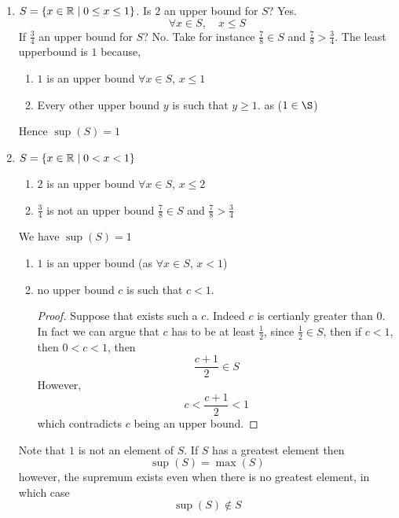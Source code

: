\documentclass{article}
\begin{document}
\begin{eg}\leavevmode
    \begin{enumerate}[label=(\arabic*)]
        \item $S = \left\{ x \in \mathbb{R} \mid 0 \leq x \leq 1 \right\}$.
        Is $2$ an upper bound for $S$? Yes.
        \[
            \forall x \in S, \quad x \leq S  
        \]
        If $\frac{3}{4}$ an upper bound for $S$? No. 
        Take for instance $\frac{7}{8} \in S$ and $\frac{7}{8} > \frac{3}{4}$.
        The least upperbound is $1$ because,
        \begin{enumerate}[label=(\roman*)]
            \item $1$ is an upper bound $\forall x \in S$, $x \leq 1$
            \item Every other upper bound $y$ is such that $y \geq 1$. as ($1 \in \S$)
        \end{enumerate}
        Hence $\sup(S) = 1$

        \item $S = \left\{ x \in \mathbb{R} \mid 0 < x < 1 \right\}$
        \begin{enumerate}[label=(\roman*)]
            \item $2$ is an upper bound $\forall x \in S$, $x \leq 2$
            \item $\frac{3}{4}$ is not an upper bound $\frac{7}{8} \in S$ and $\frac{7}{8} > \frac{3}{4}$
        \end{enumerate}
        We have $\sup(S) = 1$
        \begin{enumerate}[label=(\roman*)]
            \item $1$ is an upper bound (as $\forall x \in S$, $x < 1$)
            \item no upper bound $c$ is such that $c < 1$.
            \begin{proof}
                Suppose that exists such a $c$.
                Indeed $c$ is certianly greater than $0$.
                In fact we can argue that $c$ has to be at least $\frac{1}{2}$, since $\frac{1}{2} \in S$,
                then if $c < 1$, then $0 < c < 1$, then
                \[
                    \frac{c + 1}{2} \in S  
                \]
                However,
                \[
                    c < \frac{c + 1}{2} < 1
                \]
                which contradicts $c$ being an upper bound.
            \end{proof}
        \end{enumerate}

        \begin{warning}
            Note that $1$ is not an element of $S$. 
            If $S$ has a greatest element then
            \[
                \sup(S) = \max(S)  
            \]
            however, the supremum exists even when there is no greatest element, in which case
            \[
                \sup(S) \notin S  
            \]
        \end{warning}


\end{enumerate}
\end{eg}
\end{document}
